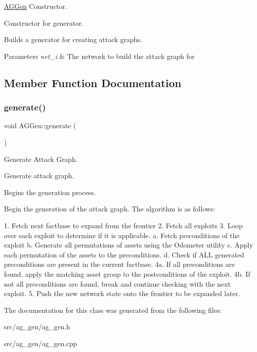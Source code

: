 \mbox{\hyperlink{class_a_g_gen}{A\+G\+Gen}} Constructor. 

Constructor for generator.

Builds a generator for creating attack graphs.


\begin{DoxyParams}{Parameters}
{\em net\+\_\+i} & The network to build the attack graph for \\
\hline
\end{DoxyParams}


\subsection{Member Function Documentation}
\mbox{\label{class_a_g_gen_a0c95ee4d204aa3cc985570f9cf592c14}} 
\subsubsection{\texorpdfstring{generate()}{generate()}}
{\footnotesize\ttfamily void A\+G\+Gen\+::generate (\begin{DoxyParamCaption}{ }\end{DoxyParamCaption})}



Generate Attack Graph. 

Generate attack graph.

Begins the generation process.

Begin the generation of the attack graph. The algorithm is as follows\+: \begin{DoxyVerb} 1. Fetch next factbase to expand from the frontier
 2. Fetch all exploits
 3. Loop over each exploit to determine if it is applicable.
     a. Fetch preconditions of the exploit
     b. Generate all permutations of assets using the Odometer utility
     c. Apply each permutation of the assets to the preconditions.
     d. Check if ALL generated preconditions are present in the current factbase.
 4a. If all preconditions are found, apply the matching asset group to the postconditions of the exploit.
 4b. If not all preconditions are found, break and continue checking with the next exploit.
 5. Push the new network state onto the frontier to be expanded later.\end{DoxyVerb}
 

The documentation for this class was generated from the following files\+:\begin{DoxyCompactItemize}
\item 
src/ag\+\_\+gen/ag\+\_\+gen.\+h\item 
src/ag\+\_\+gen/ag\+\_\+gen.\+cpp\end{DoxyCompactItemize}
